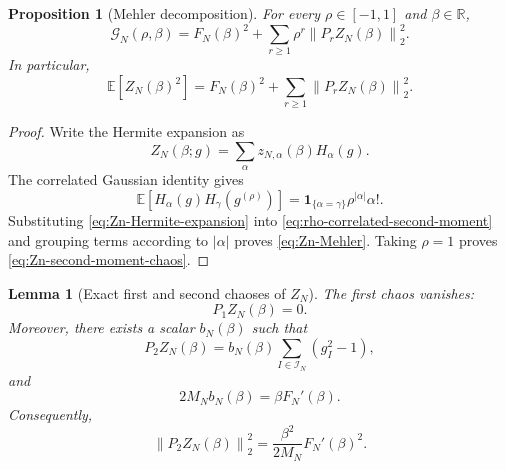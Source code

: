 \documentclass[11pt]{article}
\newtheorem{lemma}[theorem]{Lemma}
\newtheorem{proposition}[theorem]{Proposition}
\newcommand{\E}{\mathbb{E}}
\newcommand{\R}{\mathbb{R}}
\newcommand{\calI}{\mathcal{I}}
\newcommand{\ind}{\mathbf{1}}
\newcommand{\norm}[1]{\left\lVert #1\right\rVert}
\begin{document}
\begin{proposition}[Mehler decomposition]\label{prop:Zn-Mehler}
  For every $\rho\in[-1,1]$ and $\beta\in\R$,
  \begin{equation}\label{eq:Zn-Mehler}
    \mathcal G_N(\rho,\beta)
    =
    F_N(\beta)^2
    +
    \sum_{r\geq1}\rho^r\norm{P_rZ_N(\beta)}_2^2.
  \end{equation}
  In particular,
  \begin{equation}\label{eq:Zn-second-moment-chaos}
    \E[Z_N(\beta)^2]
    =
    F_N(\beta)^2
    +
    \sum_{r\geq1}\norm{P_rZ_N(\beta)}_2^2.
  \end{equation}
\end{proposition}

\begin{proof}
  Write the Hermite expansion as
  \begin{equation}\label{eq:Zn-Hermite-expansion}
    Z_N(\beta;g)
    =
    \sum_{\alpha}z_{N,\alpha}(\beta)H_\alpha(g).
  \end{equation}
  The correlated Gaussian identity gives
  \begin{equation}\label{eq:correlated-Hermite-identity}
    \E\left[
      H_\alpha(g)H_\gamma(g^{(\rho)})
    \right]
    =
    \ind_{\{\alpha=\gamma\}}\rho^{|\alpha|}\alpha!.
  \end{equation}
  Substituting \eqref{eq:Zn-Hermite-expansion} into
  \eqref{eq:rho-correlated-second-moment} and grouping terms according to
  $|\alpha|$ proves \eqref{eq:Zn-Mehler}.  Taking $\rho=1$ proves
  \eqref{eq:Zn-second-moment-chaos}.
\end{proof}

\begin{lemma}[Exact first and second chaoses of $Z_N$]
  \label{lem:Zn-first-second-chaos}
  The first chaos vanishes:
  \begin{equation}\label{eq:Zn-first-chaos-zero}
    P_1Z_N(\beta)=0.
  \end{equation}
  Moreover, there exists a scalar $b_N(\beta)$ such that
  \begin{equation}\label{eq:Zn-second-chaos}
    P_2Z_N(\beta)
    =
    b_N(\beta)
    \sum_{I\in\calI_N}(g_I^2-1),
  \end{equation}
  and
  \begin{equation}\label{eq:bn-exact}
    2M_Nb_N(\beta)
    =
    \beta F_N'(\beta).
  \end{equation}
  Consequently,
  \begin{equation}\label{eq:Zn-second-chaos-norm}
    \norm{P_2Z_N(\beta)}_2^2
    =
    \frac{\beta^2}{2M_N}F_N'(\beta)^2.
  \end{equation}
\end{lemma}
\end{document}
